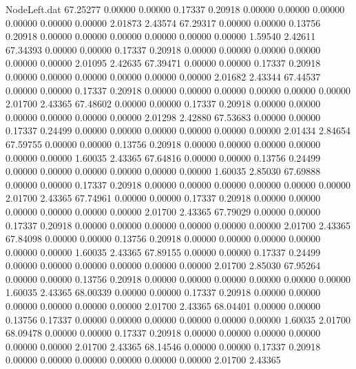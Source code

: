 \begin{filecontents}{NodeLeft.dat}
  67.25277    0.00000    0.00000     0.17337    0.20918    0.00000    0.00000    0.00000    0.00000    0.00000    0.00000    2.01873    2.43574
  67.29317    0.00000    0.00000     0.13756    0.20918    0.00000    0.00000    0.00000    0.00000    0.00000    0.00000    1.59540    2.42611
  67.34393    0.00000    0.00000     0.17337    0.20918    0.00000    0.00000    0.00000    0.00000    0.00000    0.00000    2.01095    2.42635
  67.39471    0.00000    0.00000     0.17337    0.20918    0.00000    0.00000    0.00000    0.00000    0.00000    0.00000    2.01682    2.43344
  67.44537    0.00000    0.00000     0.17337    0.20918    0.00000    0.00000    0.00000    0.00000    0.00000    0.00000    2.01700    2.43365
  67.48602    0.00000    0.00000     0.17337    0.20918    0.00000    0.00000    0.00000    0.00000    0.00000    0.00000    2.01298    2.42880
  67.53683    0.00000    0.00000     0.17337    0.24499    0.00000    0.00000    0.00000    0.00000    0.00000    0.00000    2.01434    2.84654
  67.59755    0.00000    0.00000     0.13756    0.20918    0.00000    0.00000    0.00000    0.00000    0.00000    0.00000    1.60035    2.43365
  67.64816    0.00000    0.00000     0.13756    0.24499    0.00000    0.00000    0.00000    0.00000    0.00000    0.00000    1.60035    2.85030
  67.69888    0.00000    0.00000     0.17337    0.20918    0.00000    0.00000    0.00000    0.00000    0.00000    0.00000    2.01700    2.43365
  67.74961    0.00000    0.00000     0.17337    0.20918    0.00000    0.00000    0.00000    0.00000    0.00000    0.00000    2.01700    2.43365
  67.79029    0.00000    0.00000     0.17337    0.20918    0.00000    0.00000    0.00000    0.00000    0.00000    0.00000    2.01700    2.43365
  67.84098    0.00000    0.00000     0.13756    0.20918    0.00000    0.00000    0.00000    0.00000    0.00000    0.00000    1.60035    2.43365
  67.89155    0.00000    0.00000     0.17337    0.24499    0.00000    0.00000    0.00000    0.00000    0.00000    0.00000    2.01700    2.85030
  67.95264    0.00000    0.00000     0.13756    0.20918    0.00000    0.00000    0.00000    0.00000    0.00000    0.00000    1.60035    2.43365
  68.00339    0.00000    0.00000     0.17337    0.20918    0.00000    0.00000    0.00000    0.00000    0.00000    0.00000    2.01700    2.43365
  68.04401    0.00000    0.00000     0.13756    0.17337    0.00000    0.00000    0.00000    0.00000    0.00000    0.00000    1.60035    2.01700
  68.09478    0.00000    0.00000     0.17337    0.20918    0.00000    0.00000    0.00000    0.00000    0.00000    0.00000    2.01700    2.43365
  68.14546    0.00000    0.00000     0.17337    0.20918    0.00000    0.00000    0.00000    0.00000    0.00000    0.00000    2.01700    2.43365

\end{filecontents}
